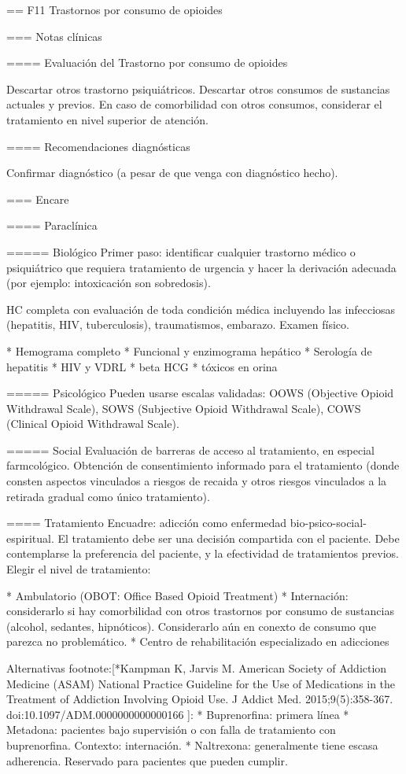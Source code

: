 == F11 Trastornos por consumo de opioides

=== Notas clínicas

==== Evaluación del Trastorno por consumo de opioides

Descartar otros trastorno psiquiátricos.
Descartar otros consumos de sustancias actuales y previos.
En caso de comorbilidad con otros consumos, considerar el tratamiento en nivel superior de atención.

==== Recomendaciones diagnósticas

Confirmar diagnóstico (a pesar de que venga con diagnóstico hecho).

=== Encare

==== Paraclínica

===== Biológico
Primer paso: identificar cualquier trastorno médico o psiquiátrico que requiera tratamiento de urgencia y hacer la derivación adecuada (por ejemplo: intoxicación son sobredosis).

HC completa con evaluación de toda condición médica incluyendo las infecciosas (hepatitis, HIV, tuberculosis), traumatismos, embarazo. Examen físico.

* Hemograma completo
* Funcional y enzimograma hepático
* Serología de hepatitis
* HIV y VDRL
* beta HCG
* tóxicos en orina

===== Psicológico
Pueden usarse escalas validadas: OOWS (Objective Opioid Withdrawal Scale), SOWS (Subjective Opioid Withdrawal Scale), COWS (Clinical Opioid Withdrawal Scale).

===== Social
Evaluación de barreras de acceso al tratamiento, en especial farmcológico.
Obtención de consentimiento informado para el tratamiento (donde consten aspectos vinculados a riesgos de recaida y otros riesgos vinculados a la retirada gradual como único tratamiento).

==== Tratamiento
Encuadre: adicción como enfermedad bio-psico-social-espiritual.
El tratamiento debe ser una decisión compartida con el paciente. Debe contemplarse la preferencia del paciente, y la efectividad de tratamientos previos. Elegir el nivel de tratamiento:

* Ambulatorio (OBOT: Office Based Opioid Treatment)
* Internación: considerarlo si hay comorbilidad con otros trastornos por consumo de sustancias (alcohol, sedantes, hipnóticos). Considerarlo aún en conexto de consumo que parezca no problemático.
* Centro de rehabilitación especializado en adicciones

Alternativas footnote:[*Kampman K, Jarvis M. American Society of Addiction Medicine (ASAM) National Practice Guideline for the Use of Medications in the Treatment of Addiction Involving Opioid Use. J Addict Med. 2015;9(5):358-367. doi:10.1097/ADM.0000000000000166
]:
  * Buprenorfina: primera línea
  * Metadona: pacientes bajo supervisión o con falla de tratamiento con buprenorfina. Contexto: internación.
  * Naltrexona: generalmente tiene escasa adherencia. Reservado para pacientes que pueden cumplir.

